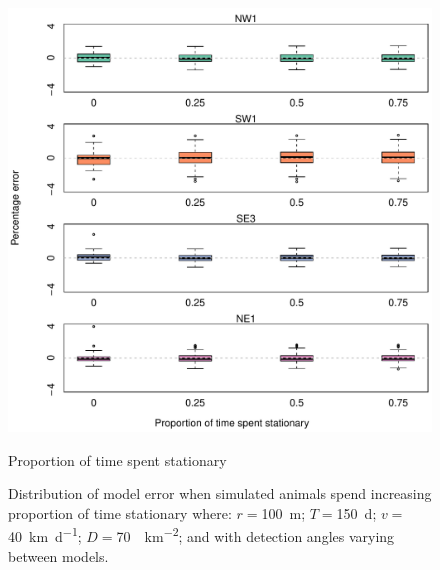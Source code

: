 \documentclass[a4paper,10pt,reqno,oneside]{amsart}
\begin{document}
\begin{figure}[t]
      \centering
	\includegraphics[width=1\textwidth]{imgs/ResultsPerch.pdf}
          \caption{Proportion of time spent stationary}
          \label{f:Perch}
	\caption{Distribution of model error when simulated animals spend increasing proportion of time stationary where:  $r = $\SI{100}{\meter}; $T = $\SI{150}{\day}; $v = $ \SI{40}{\kilo\meter\per\day}; $D=$\SI{70}{\animals\per\kilo\meter\squared}; and with detection angles varying between models.  } 
\end{figure}
\end{document}
